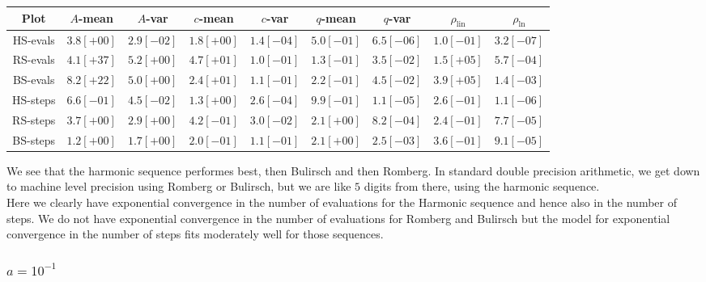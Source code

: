 \begin{table}[H]
    \centering
        \small
        \begin{tabular}{c||c|c|c|c|c|c|c|c}
Plot & \(A\)-mean & \(A\)-var & \(c\)-mean & \(c\)-var & \(q\)-mean & \(q\)-var & \(\rho_{\operatorname{lin}}\) & \(\rho_{\ln}\)\\\hline
\rowcolor{green}
HS-evals & \(3.8[+00]\) & \(2.9[-02]\) & \(1.8[+00]\) & \(1.4[-04]\) & \(5.0[-01]\) & \(6.5[-06]\) & \(1.0[-01]\) & \(3.2[-07]\) \\
\rowcolor{red}
RS-evals & \(4.1[+37]\) & \(5.2[+00]\) & \(4.7[+01]\) & \(1.0[-01]\) & \(1.3[-01]\) & \(3.5[-02]\) & \(1.5[+05]\) & \(5.7[-04]\) \\
\rowcolor{red}
BS-evals & \(8.2[+22]\) & \(5.0[+00]\) & \(2.4[+01]\) & \(1.1[-01]\) & \(2.2[-01]\) & \(4.5[-02]\) & \(3.9[+05]\) & \(1.4[-03]\) \\
\rowcolor{green}
HS-steps & \(6.6[-01]\) & \(4.5[-02]\) & \(1.3[+00]\) & \(2.6[-04]\) & \(9.9[-01]\) & \(1.1[-05]\) & \(2.6[-01]\) & \(1.1[-06]\) \\
\rowcolor{yellow}
RS-steps & \(3.7[+00]\) & \(2.9[+00]\) & \(4.2[-01]\) & \(3.0[-02]\) & \(2.1[+00]\) & \(8.2[-04]\) & \(2.4[-01]\) & \(7.7[-05]\) \\
\rowcolor{yellow}
BS-steps & \(1.2[+00]\) & \(1.7[+00]\) & \(2.0[-01]\) & \(1.1[-01]\) & \(2.1[+00]\) & \(2.5[-03]\) & \(3.6[-01]\) & \(9.1[-05]\) \\
    \end{tabular}
    \label{tab:my_label}
\end{table}

We see that the harmonic sequence performes best, then Bulirsch and then Romberg. In standard double precision arithmetic, we get down to machine level precision using Romberg or Bulirsch, but we are like \(5\) digits from there, using the harmonic sequence.\\

Here we clearly have exponential convergence in the number of evaluations for the Harmonic sequence and hence also in the number of steps. We do not have exponential convergence in the number of evaluations for Romberg and Bulirsch but the model for exponential convergence in the number of steps fits moderately well for those sequences. 

\subsubsection{\(a = 10^{-1}\)}

